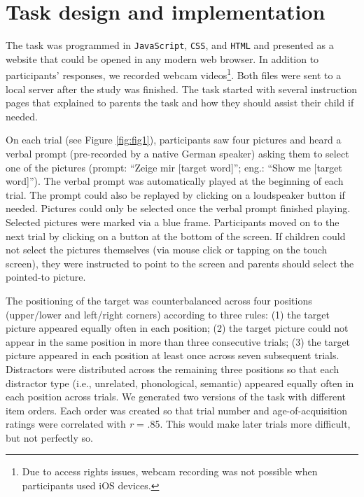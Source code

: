 \documentclass[
  man,floatsintext]{apa6}
\begin{document}
\hypertarget{task-design-and-implementation}{%
\section{Task design and implementation}\label{task-design-and-implementation}}

The task was programmed in \texttt{JavaScript}, \texttt{CSS}, and \texttt{HTML} and presented as a website that could be opened in any modern web browser. In addition to participants' responses, we recorded webcam videos\footnote{Due to access rights issues, webcam recording was not possible when participants used iOS devices.}. Both files were sent to a local server after the study was finished. The task started with several instruction pages that explained to parents the task and how they should assist their child if needed.

On each trial (see Figure \ref{fig:fig1}), participants saw four pictures and heard a verbal prompt (pre-recorded by a native German speaker) asking them to select one of the pictures (prompt: ``Zeige mir {[}target word{]}''; eng.: ``Show me {[}target word{]}''). The verbal prompt was automatically played at the beginning of each trial. The prompt could also be replayed by clicking on a loudspeaker button if needed. Pictures could only be selected once the verbal prompt finished playing. Selected pictures were marked via a blue frame. Participants moved on to the next trial by clicking on a button at the bottom of the screen. If children could not select the pictures themselves (via mouse click or tapping on the touch screen), they were instructed to point to the screen and parents should select the pointed-to picture.

The positioning of the target was counterbalanced across four positions (upper/lower and left/right corners) according to three rules: (1) the target picture appeared equally often in each position; (2) the target picture could not appear in the same position in more than three consecutive trials; (3) the target picture appeared in each position at least once across seven subsequent trials. Distractors were distributed across the remaining three positions so that each distractor type (i.e., unrelated, phonological, semantic) appeared equally often in each position across trials. We generated two versions of the task with different item orders. Each order was created so that trial number and age-of-acquisition ratings were correlated with \emph{r} = .85. This would make later trials more difficult, but not perfectly so.
\end{document}
